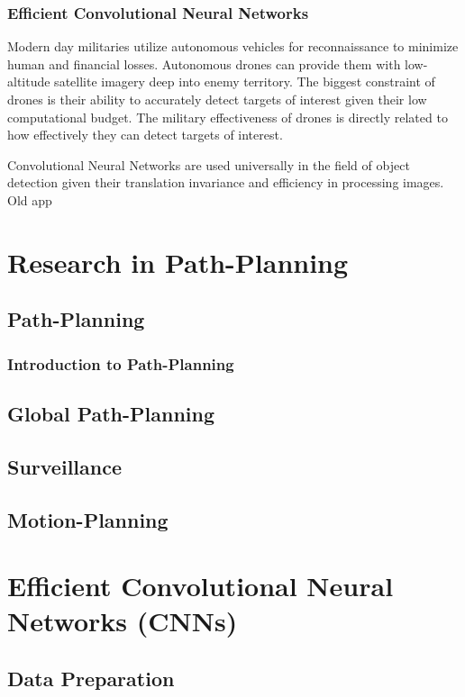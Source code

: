 \documentclass[12pt]{book}
\begin{document}
\subsection{Efficient Convolutional Neural Networks}
Modern day militaries utilize autonomous vehicles for reconnaissance to minimize human and financial losses. Autonomous drones can provide them with low-altitude satellite imagery deep into enemy territory. The biggest constraint of drones is their ability to accurately detect targets of interest given their low computational budget. The military effectiveness of drones is directly related to how effectively they can detect targets of interest.

Convolutional Neural Networks are used universally in the field of object detection given their translation invariance and efficiency in processing images. Old app




\chapter{Research in Path-Planning}
\section{Path-Planning}
\subsection{Introduction to Path-Planning}

\section{Global Path-Planning}

\section{Surveillance}

\section{Motion-Planning}

\chapter{Efficient Convolutional Neural Networks (CNNs)}
\section{Data Preparation}
\end{document}
